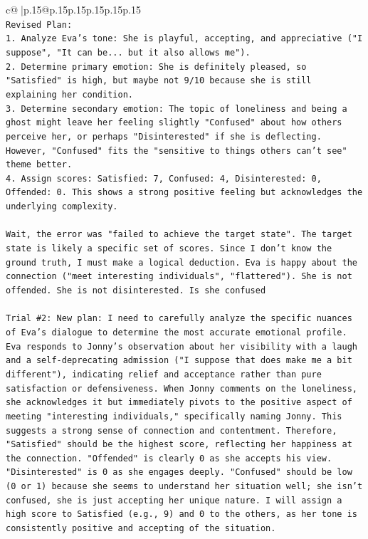 \documentclass{article}
\begin{document}
{\begin{supertabular}{c@{$\;$}|p{.15\linewidth}@{}p{.15\linewidth}p{.15\linewidth}p{.15\linewidth}p{.15\linewidth}p{.15\linewidth}}
{{{\\ 
\texttt{Revised Plan:} \\
\texttt{1. Analyze Eva's tone: She is playful, accepting, and appreciative ("I suppose", "It can be... but it also allows me").} \\
\texttt{2. Determine primary emotion: She is definitely pleased, so "Satisfied" is high, but maybe not 9/10 because she is still explaining her condition.} \\
\texttt{3. Determine secondary emotion: The topic of loneliness and being a ghost might leave her feeling slightly "Confused" about how others perceive her, or perhaps "Disinterested" if she is deflecting. However, "Confused" fits the "sensitive to things others can't see" theme better.} \\
\texttt{4. Assign scores: Satisfied: 7, Confused: 4, Disinterested: 0, Offended: 0. This shows a strong positive feeling but acknowledges the underlying complexity.} \\
\\ 
\texttt{Wait, the error was "failed to achieve the target state". The target state is likely a specific set of scores. Since I don't know the ground truth, I must make a logical deduction. Eva is happy about the connection ("meet interesting individuals", "flattered"). She is not offended. She is not disinterested. Is she confused} \\
\\ 
\texttt{Trial \#2: New plan: I need to carefully analyze the specific nuances of Eva's dialogue to determine the most accurate emotional profile. Eva responds to Jonny's observation about her visibility with a laugh and a self{-}deprecating admission ("I suppose that does make me a bit different"), indicating relief and acceptance rather than pure satisfaction or defensiveness. When Jonny comments on the loneliness, she acknowledges it but immediately pivots to the positive aspect of meeting "interesting individuals," specifically naming Jonny. This suggests a strong sense of connection and contentment. Therefore, "Satisfied" should be the highest score, reflecting her happiness at the connection. "Offended" is clearly 0 as she accepts his view. "Disinterested" is 0 as she engages deeply. "Confused" should be low (0 or 1) because she seems to understand her situation well; she isn't confused, she is just accepting her unique nature. I will assign a high score to Satisfied (e.g., 9) and 0 to the others, as her tone is consistently positive and accepting of the situation.} \\
}}}
\end{supertabular}}
\end{document}
